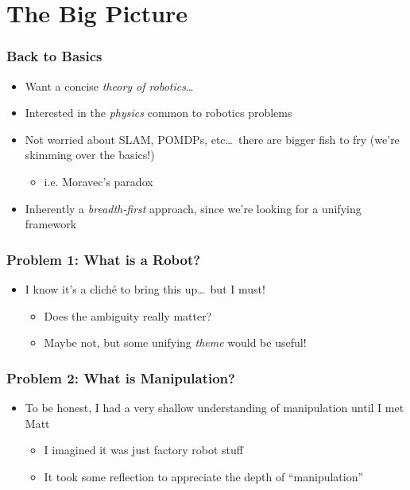 \documentclass[aspectratio=169,handout]{beamer}
\begin{document}
	\section{The Big Picture}
		\begin{frame}
			\frametitle{Back to Basics}
			\begin{itemize}[<+->]
				\item Want a concise \emph{theory of robotics}\dots
				\item Interested in the \emph{physics} common to robotics problems
				\item Not worried about SLAM, POMDPs, etc\dots~there are bigger fish to fry (we're skimming over the basics!)
					\begin{itemize}
						\item i.e. Moravec's paradox \autocite{moravec1988mind}
					\end{itemize}
				\item Inherently a \emph{breadth-first} approach, since we're looking for a unifying framework
			\end{itemize}
		\end{frame}
	
		\begin{frame}
			\frametitle{Problem 1: What is a Robot?}
			\begin{itemize}
				\item I know it's a cliché to bring this up\dots \pause~but I must! \pause
				\begin{itemize}
					\item Does the ambiguity really matter? \pause
					\item Maybe not, but some unifying \emph{theme} would be useful!
				\end{itemize}
			\end{itemize}
		\end{frame}
	
		\begin{frame}
			\frametitle{Problem 2: What is Manipulation?}
			\begin{itemize}
				\item To be honest, I had a very shallow understanding of manipulation until I met Matt \pause
					\begin{itemize}
						\item I imagined it was just factory robot stuff \pause
						\item It took some reflection to appreciate the depth of ``manipulation''
					\end{itemize}
			\end{itemize}
		\end{frame}
	
\end{document}
